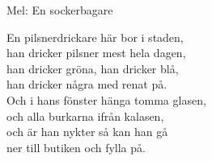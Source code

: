 \begin{SongText}[En pilsnerdrickare]
    \begin{SongInfo}
        Mel: En sockerbagare
    \end{SongInfo}
    \begin{SongVerse}
        En pilsnerdrickare här bor i staden,\\%
        han dricker pilsner mest hela dagen,\\%
        han dricker gröna, han dricker blå,\\%
        han dricker några med renat på.\\%
        Och i hans fönster hänga tomma glasen,\\%
        och alla burkarna ifrån kalasen,\\%
        och är han nykter så kan han gå\\%
        ner till butiken och fylla på.
    \end{SongVerse}
\end{SongText}
